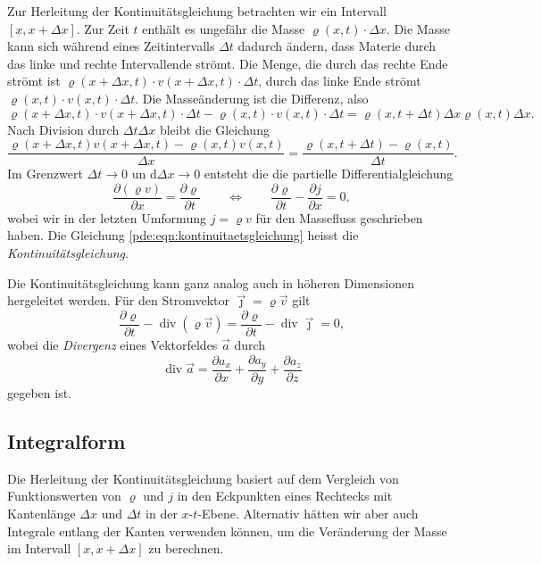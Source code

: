 Zur Herleitung der Kontinuitätsgleichung betrachten wir ein
Intervall $[x,x+\Delta x]$.
Zur Zeit $t$ enthält es ungefähr die Masse $\varrho(x,t)\cdot\Delta x$.
Die Masse kann sich während eines Zeitintervalls $\Delta t$ dadurch
ändern, dass Materie durch das linke und rechte Intervallende strömt.
Die Menge, die durch das rechte Ende strömt ist
$\varrho(x+\Delta x,t)\cdot v(x+\Delta x,t)\cdot \Delta t$,
durch das linke Ende strömt
$\varrho(x,t)\cdot v(x,t)\cdot \Delta t$.
Die Masseänderung ist die Differenz, also
\[
\varrho(x+\Delta x,t)\cdot v(x+\Delta x,t)\cdot \Delta t
-
\varrho(x,t)\cdot v(x,t)\cdot \Delta t
=
\varrho(x,t+\Delta t)\Delta x
\varrho(x,t)\Delta x.
\]
Nach Division durch $\Delta t\Delta x $ bleibt die Gleichung
\[
\frac{\varrho(x+\Delta x,t)v(x+\Delta x,t) - \varrho(x,t)v(x,t)}{\Delta x}
=
\frac{\varrho(x,t+\Delta t)-\varrho(x,t)}{\Delta t}.
\]
Im Grenzwert $\Delta t\to 0$ un d$\Delta x\to 0$ entsteht die
die partielle Differentialgleichung
\begin{equation}
\frac{\partial (\varrho v)}{\partial x} = \frac{\partial \varrho}{\partial t}
\qquad\Leftrightarrow\qquad
\frac{\partial\varrho}{\partial t} - \frac{\partial j}{\partial x}=0,
\label{pde:eqn:kontinuitaetsgleichung}
\end{equation}
wobei wir in der letzten Umformung $j=\varrho v$ für den Massefluss
geschrieben haben.
Die Gleichung \eqref{pde:eqn:kontinuitaetsgleichung} heisst die
{\em Kontinuitätsgleichung}.
%

Die Kontinuitätsgleichung kann ganz analog auch in höheren Dimensionen
hergeleitet werden.
Für den Stromvektor $\vec{\jmath}=\varrho\vec{v}$ gilt
\[
\frac{\partial \varrho}{\partial t}
-
\operatorname{div}(\varrho \vec{v})
=
\frac{\partial \varrho}{\partial t}
-
\operatorname{div}\vec{\jmath}
=
0,
\]
wobei die {\em Divergenz}
%
eines Vektorfeldes $\vec{a}$ durch
\[
\operatorname{div}\vec{a}
=
\frac{\partial a_x}{\partial x}
+
\frac{\partial a_y}{\partial y}
+
\frac{\partial a_z}{\partial z}
\]
gegeben ist.

\subsection{Integralform}
%
Die Herleitung der Kontinuitätsgleichung basiert auf dem Vergleich
von Funktionswerten von $\varrho$ und $j$ in den Eckpunkten eines
Rechtecks mit Kantenlänge $\Delta x$ und $\Delta t$ in der $x$-$t$-Ebene.
Alternativ hätten wir aber auch Integrale entlang der Kanten verwenden
können, um die Veränderung der Masse im Intervall $[x,x+\Delta x]$ 
zu berechnen.

